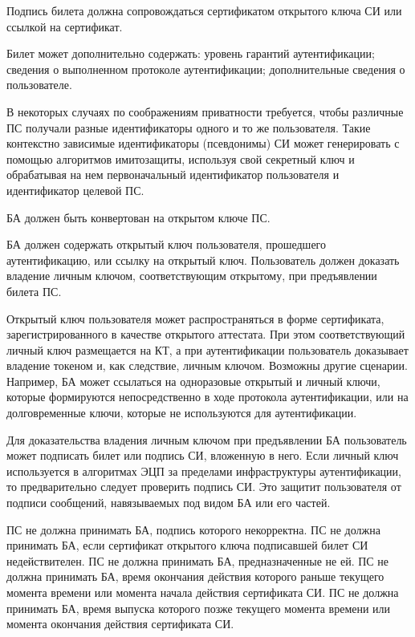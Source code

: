 Подпись билета должна сопровождаться сертификатом открытого ключа СИ или 
ссылкой на сертификат.  

\begin{note}
Билет может дополнительно содержать: 
уровень гарантий аутентификации;
сведения о выполненном протоколе аутентификации;
дополнительные сведения о пользователе.
\end{note}

\begin{note}
В некоторых случаях по соображениям приватности требуется, 
чтобы различные ПС получали разные идентификаторы одного и то же 
пользователя.
%
Такие контекстно зависимые идентификаторы (псевдонимы) СИ может генерировать 
с помощью алгоритмов имитозащиты, используя свой секретный ключ и обрабатывая 
на нем первоначальный идентификатор пользователя и идентификатор целевой ПС.
\end{note}

БА должен быть конвертован на открытом ключе ПС.

БА должен содержать открытый ключ пользователя, прошедшего аутентификацию, или 
ссылку на открытый ключ.
%
Пользователь должен доказать владение личным ключом, соответствующим  
открытому, при предъявлении билета ПС.

\begin{note}
Открытый ключ пользователя может распространяться в форме сертификата, 
зарегистрированного в качестве открытого аттестата. 
%
При этом соответствующий личный ключ размещается на КТ, а при 
аутентификации пользователь доказывает владение токеном и, как следствие, 
личным ключом.
%
Возможны другие сценарии. Например, БА может ссылаться на одноразовые открытый 
и личный ключи, которые формируются непосредственно в ходе протокола
аутентификации, или на долговременные ключи, которые не используются для
аутентификации.
\end{note}

\begin{note}
Для доказательства владения личным ключом при предъявлении БА пользователь
может подписать билет или подпись СИ, вложенную в него. 
%
Если личный ключ используется в алгоритмах ЭЦП за пределами инфраструктуры 
аутентификации, то предварительно следует проверить подпись СИ.
%
Это защитит пользователя от подписи сообщений, навязываемых под видом БА или 
его частей.
\end{note}

ПС не должна принимать БА, подпись которого некорректна.
%
ПС не должна принимать БА, если сертификат открытого ключа подписавшей билет СИ 
недействителен.
%
ПС не должна принимать БА, предназначенные не ей.
%
ПС не должна принимать БА, время окончания действия которого раньше текущего 
момента времени или момента начала действия сертификата СИ.
%
ПС не должна принимать БА, время выпуска которого позже текущего момента 
времени или момента окончания действия сертификата СИ. 

